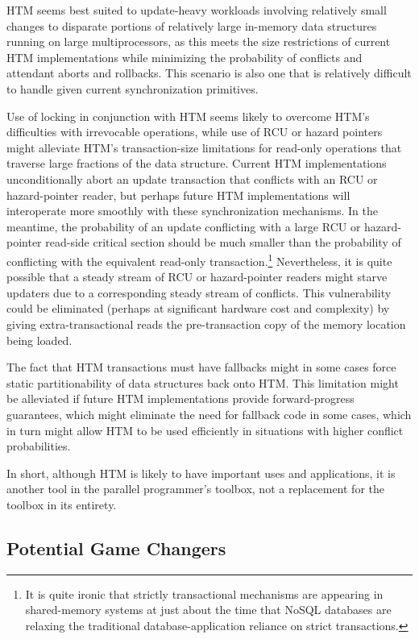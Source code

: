 HTM seems best suited to update-heavy workloads involving relatively
small changes to disparate portions of relatively large in-memory
data structures running on large multiprocessors,
as this meets the size restrictions of current HTM implementations while
minimizing the probability of conflicts and attendant aborts and
rollbacks.
This scenario is also one that is relatively difficult to handle given
current synchronization primitives.

Use of locking in conjunction with HTM seems likely to overcome HTM's
difficulties with irrevocable operations, while use of RCU or
hazard pointers might alleviate HTM's transaction-size limitations
for read-only operations that traverse large fractions of the data
structure.
Current HTM implementations unconditionally abort an update transaction
that conflicts with an RCU or hazard-pointer reader, but perhaps future
HTM implementations will interoperate more smoothly with these
synchronization mechanisms.
In the meantime, the probability of an update conflicting with a
large RCU or hazard-pointer read-side critical section should be
much smaller than the probability of conflicting with the equivalent
read-only transaction.\footnote{
	It is quite ironic that strictly transactional mechanisms are
	appearing in shared-memory systems at just about the time
	that NoSQL databases are relaxing the traditional
	database-application reliance on strict transactions.}
Nevertheless, it is quite possible that a steady stream of RCU or
hazard-pointer readers might starve updaters due to a corresponding
steady stream of conflicts.
This vulnerability could be eliminated (perhaps at significant
hardware cost and complexity) by giving extra-transactional
reads the pre-transaction copy of the memory location being loaded.

The fact that HTM transactions must have fallbacks might in some cases
force static partitionability of data structures back onto HTM.
This limitation might be alleviated if future HTM implementations
provide forward-progress guarantees, which might eliminate the need
for fallback code in some cases, which in turn might allow HTM to
be used efficiently in situations with higher conflict probabilities.

In short, although HTM is likely to have important uses and applications,
it is another tool in the parallel programmer's toolbox, not a replacement
for the toolbox in its entirety.

\subsection{Potential Game Changers}
\label{sec:future:Potential Game Changers}

